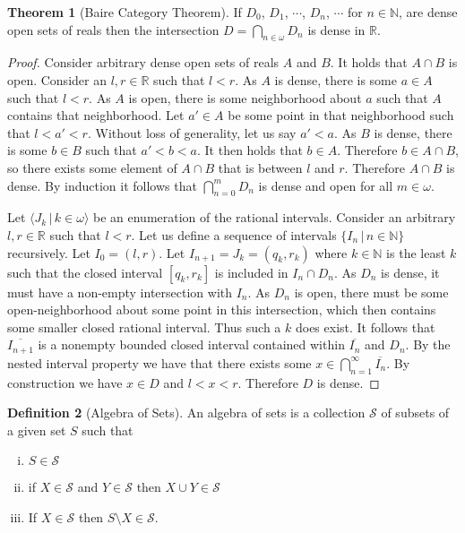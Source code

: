 \documentclass{article}
\theoremstyle{definition}
\newtheorem{thm}{Theorem}[section]
\newtheorem{defn}[thm]{Definition}
\newcommand{\N}{\mathbb{N}}
\newcommand{\R}{\mathbb{R}}
\begin{document}
\begin{thm}[Baire Category Theorem]
    If $D_0$, $D_1$, $\cdots$, $D_n$, $\cdots$ for $n \in \N$, are dense open sets of reals then the intersection $D = \bigcap_{n \in \omega} D_n$ is dense in $\R$.
\end{thm}

\begin{proof}
    Consider arbitrary dense open sets of reals $A$ and $B$. It holds that $A \cap B$ is open. Consider an $l, r \in \R$ such that $l < r$. As $A$ is dense, there is some $a \in A$ such that $l < r$. As $A$ is open, there is some neighborhood about $a$ such that $A$ contains that neighborhood. Let $a' \in A$ be some point in that neighborhood such that $l < a' < r$. Without loss of generality, let us say $a' < a$. As $B$ is dense, there is some $b \in B$ such that $a' < b < a$. It then holds that $b \in A$. Therefore $b \in A \cap B$, so there exists some element of $A \cap B$ that is between $l$ and $r$. Therefore $A \cap B$ is dense. By induction it follows that $\bigcap_{n = 0}^{m} D_n$ is dense and open for all $m \in \omega$.

    Let $\langle J_k \, | \, k \in \omega \rangle$ be an enumeration of the rational intervals. Consider an arbitrary $l, r \in \R$ such that $l < r$. Let us define a sequence of intervals $\{I_n \, | \, n \in \N\}$ recursively. Let $I_0 = (l, r)$. Let $I_{n + 1} = J_k = (q_k, r_k)$ where $k \in \N$ is the least $k$ such that the closed interval $[q_k, r_k]$ is included in $I_n \cap D_n$. As $D_n$ is dense, it must have a non-empty intersection with $I_n$. As $D_n$ is open, there must be some open-neighborhood about some point in this intersection, which then contains some smaller closed rational interval. Thus such a $k$ does exist. It follows that $\overline{I_{n + 1}}$ is a nonempty bounded closed interval contained within $\overline{I_n}$ and $D_n$. By the nested interval property we have that there exists some $x \in \bigcap_{n = 1}^\infty \overline{I_n}$. By construction we have $x \in D$ and $l < x < r$. Therefore $D$ is dense.
\end{proof}

\newpage

\begin{defn}[Algebra of Sets]
    An algebra of sets is a collection $\mathcal{S}$ of subsets of a given set $S$ such that
    \begin{enumerate}[(i)]
        \item $S \in \mathcal{S}$
        \item if $X \in \mathcal{S}$ and $Y \in \mathcal{S}$ then $X \cup Y \in \mathcal{S}$
        \item If $X \in \mathcal{S}$ then $S \setminus X \in \mathcal{S}$.
    \end{enumerate}
\end{defn}
\end{document}
